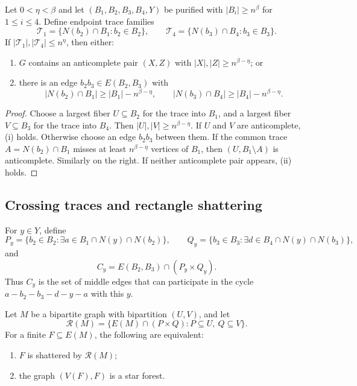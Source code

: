 \begin{proposition}\label{prop:trace-count}
Let $0<\eta<\beta$ and let $(B_1,B_2,B_3,B_4,Y)$ be purified with $|B_i|\ge n^\beta$ for $1\le i\le 4$. Define endpoint trace families
\[
  \mathcal T_1=\{N(b_2)\cap B_1:b_2\in B_2\},
  \qquad
  \mathcal T_4=\{N(b_3)\cap B_4:b_3\in B_3\}.
\]
If $|\mathcal T_1|,|\mathcal T_4|\le n^\eta$, then either:
\begin{enumerate}[label=(\roman*)]
\item $G$ contains an anticomplete pair $(X,Z)$ with $|X|,|Z|\ge n^{\beta-\eta}$; or
\item there is an edge $b_2b_3\in E(B_2,B_3)$ with
\[
  |N(b_2)\cap B_1|\ge |B_1|-n^{\beta-\eta},
  \qquad
  |N(b_3)\cap B_4|\ge |B_4|-n^{\beta-\eta}.
\]
\end{enumerate}
\end{proposition}

\begin{proof}
Choose a largest fiber $U\subseteq B_2$ for the trace into $B_1$, and a largest fiber $V\subseteq B_3$ for the trace into $B_4$. Then $|U|,|V|\ge n^{\beta-\eta}$. If $U$ and $V$ are anticomplete, (i) holds. Otherwise choose an edge $b_2b_3$ between them. If the common trace $A=N(b_2)\cap B_1$ misses at least $n^{\beta-\eta}$ vertices of $B_1$, then $(U,B_1\setminus A)$ is anticomplete. Similarly on the right. If neither anticomplete pair appears, (ii) holds.
\end{proof}

\subsection{Crossing traces and rectangle shattering}

For $y\in Y$, define
\[
  P_y=\{b_2\in B_2: \exists a\in B_1\cap N(y)\cap N(b_2)\},
  \qquad
  Q_y=\{b_3\in B_3: \exists d\in B_4\cap N(y)\cap N(b_3)\},
\]
and
\[
  C_y=E(B_2,B_3)\cap (P_y\times Q_y).
\]
Thus $C_y$ is the set of middle edges that can participate in the cycle $a-b_2-b_3-d-y-a$ with this $y$.

\begin{theorem}\label{thm:star-forest}
Let $M$ be a bipartite graph with bipartition $(U,V)$, and let
\[
  \mathcal R(M)=\{E(M)\cap(P\times Q):P\subseteq U,
  \ Q\subseteq V\}.
\]
For a finite $F\subseteq E(M)$, the following are equivalent:
\begin{enumerate}[label=(\roman*)]
\item $F$ is shattered by $\mathcal R(M)$;
\item the graph $(V(F),F)$ is a star forest.
\end{enumerate}
\end{theorem}

